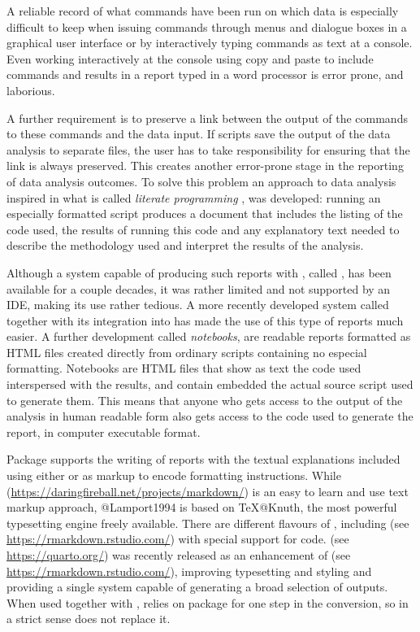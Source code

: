 \documentclass[krantz2]{krantz}\usepackage{knitr}
\begin{document}
A reliable record of what commands have been run on which data is especially difficult to keep when issuing commands through menus and dialogue boxes in a graphical user interface or by interactively typing commands as text at a console. Even working interactively at the \Rpgrm console using copy and paste to include commands and results in a report typed in a word processor is error prone, and laborious.

A further requirement is to preserve a link between the output of the \Rlang commands to these commands and the data input. If scripts save the output of the data analysis to separate files, the user has to take responsibility for ensuring that the link is always preserved. This creates another error-prone stage in the reporting of data analysis outcomes. To solve this problem an approach to data analysis inspired in what is called \emph{literate programming} \autocite{Knuth1984a}, was developed: running an especially formatted script produces a document that includes the listing of the \Rlang code used, the results of running this code and any explanatory text needed to describe the methodology used and interpret the results of the analysis.

Although a system capable of producing such reports with \Rlang, called  \autocite{Leisch2002}, has been available for a couple decades, it was rather limited and not supported by an IDE, making its use rather tedious. A more recently developed system called  \autocite{Xie2013} together with its integration into \RStudio has made the use of this type of reports much easier. A further development called \Rlang \emph{notebooks}, are readable reports formatted as HTML files created directly from ordinary \Rlang scripts containing no especial formatting. Notebooks are HTML files that show as text the code used interspersed with the results, and contain embedded the actual source script used to generate them. This means that anyone who gets access to the output of the analysis in human readable form also gets access to the code used to generate the report, in computer executable format.

Package  supports the writing of reports with the textual explanations included using either \Markdown or \Latex as markup to encode formatting instructions. While \Markdown (\url{https://daringfireball.net/projects/markdown/}) is an easy to learn and use text markup approach, \Latex @Lamport1994 is based on \TeX @Knuth, the most powerful typesetting engine freely available. There are different flavours of \Markdown, including \Rmarkdown (see \url{https://rmarkdown.rstudio.com/}) with special support for \Rlang code. \Quarto (see \url{https://quarto.org/}) was recently released as an enhancement of \Rmarkdown (see \url{https://rmarkdown.rstudio.com/}), improving typesetting and styling and providing a single system capable of generating a broad selection of outputs. When used together with \Rlang, \Quarto relies on package  for one step in the conversion, so in a strict sense \Quarto does not replace it.
\end{document}
